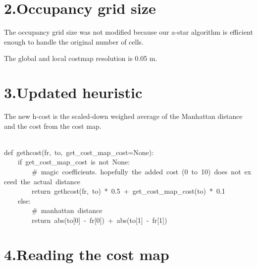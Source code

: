 \documentclass{article}
\begin{document}
\section{2.\hspace*{0.5em}Occupancy grid size}\label{sec-occupancy-grid-size}%

\noindent{}The occupancy grid size was not modified because our a-star algorithm is efficient enough to handle the original number of cells.%

The global and local costmap resolution is 0.05 m.%

\section{3.\hspace*{0.5em}Updated heuristic}\label{sec-updated-heuristic}%

\noindent{}The new h-cost is the scaled-down weighed average of the Manhattan distance and the cost from the cost map.%
\begin{mdpre}%
\\
{def}~gethcost(fr,~to,~get\_cost\_map\_cost{=}{None}){:}\\
~~~~{if}~get\_cost\_map\_cost~{is}~{not}~{None}{:}\\
~~~~~~~~{\#~magic~coefficients.~hopefully~the~added~cost~(0~to~10)~does~not~exceed~the~actual~distance}\\
~~~~~~~~{return}~gethcost(fr,~to)~*~{0.5}~+~get\_cost\_map\_cost(to)~*~{0.1}\\
~~~~{else}{:}\\
~~~~~~~~{\#~manhattan~distance}\\
~~~~~~~~{return}~abs(to[{0}]~-~fr[{0}])~+~abs(to[{1}]~-~fr[{1}])%
\end{mdpre}
\section{4.\hspace*{0.5em}Reading the cost map}\label{sec-reading-the-cost-map}%
\end{document}
